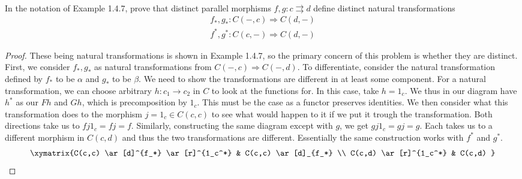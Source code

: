 \documentclass[main.tex]{subfiles}
\begin{document}
\paragraph{}
\begin{exercise}
	In the notation of Example 1.4.7, prove that distinct parallel morphisms
	$f,g: c\rightrightarrows d$ define distinct natural transformations
	\begin{align*}
		f_*,g_*: C(-,c) \Rightarrow C(d,-) \\
		f^*,g^*: C(c,-) \Rightarrow C(d,-)
	\end{align*}
\end{exercise}

\begin{proof}
	These being natural transformations is shown in Example 1.4.7, so the
	primary concern of this problem is whether they are distinct.  First, we
	consider $f_*,g_*$ as natural transformations from $C(-,c) \Rightarrow
	C(-,d)$.  To differentiate, consider the natural transformation defined by
	$f_*$ to be $\alpha$ and $g_*$ to be $\beta$.  We need to show the
	transformations are different in at least some component.  For a natural
	transformation, we can choose arbitrary $h: c_1 \rightarrow c_2$ in $C$ to
	look at the functions for.  In this case, take $h = 1_c$.  We thus in our
	diagram have $h^*$ as our $Fh$ and $Gh$, which is precomposition by $1_c$.
	This must be the case as a functor preserves identities.  We then consider
	what this transformation does to the morphism $j =1_c \in C(c,c)$ to see
	what would happen to it if we put it trough the transformation.  Both
	directions take us to $fj1_c = fj = f$.  Similarly, constructing the same
	diagram except with $g$, we get $gj1_c = gj = g$.  Each takes us to a
	different morphism in $C(c,d)$ and thus the two transformations are
	different.  Essentially the same construction works with $f^*$ and $g^*$.
	\begin{equation*}
		\xymatrix{C(c,c) \ar[d]^{f_*} \ar[r]^{1_c^*} & C(c,c) \ar[d]_{f_*} \\
		C(c,d) \ar[r]^{1_c^*} & C(c,d) }
	\end{equation*}
\end{proof}
\end{document}
